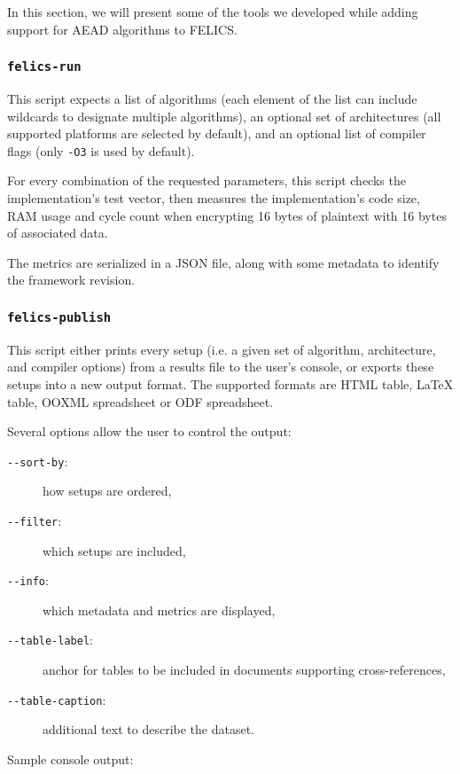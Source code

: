 \documentclass{article}
\begin{document}
In this section, we will present some of the tools we developed while
adding support for AEAD algorithms to FELICS.

\subsubsection{\texttt{felics-run}}

This script expects a list of algorithms (each element of the list can
include wildcards to designate multiple algorithms), an optional set
of architectures (all supported platforms are selected by default),
and an optional list of compiler flags (only \texttt{-O3} is used by
default).

For every combination of the requested parameters, this script checks
the implementation's test vector, then measures the implementation's
code size, RAM usage and cycle count when encrypting 16 bytes of
plaintext with 16 bytes of associated data.

The metrics are serialized in a JSON file, along with some metadata to
identify the framework revision.

\subsubsection{\texttt{felics-publish}}

This script either prints every setup (i.e. a given set of algorithm,
architecture, and compiler options) from a results file to the user's
console, or exports these setups into a new output format.  The
supported formats are HTML table, \LaTeX{} table, OOXML spreadsheet or
ODF spreadsheet.

Several options allow the user to control the output:

\begin{description}
\item[\texttt{-{}-sort-by}:] how setups are ordered,
\item[\texttt{-{}-filter}:] which setups are included,
\item[\texttt{-{}-info}:] which metadata and metrics are displayed,
\item[\texttt{-{}-table-label}:] anchor for tables to be included in
  documents supporting cross-references,
\item[\texttt{-{}-table-caption}:] additional text to describe the
  dataset.
\end{description}

Sample console output:
\end{document}
